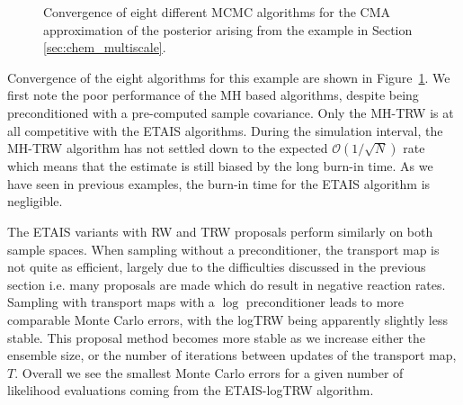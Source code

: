 \documentclass[final]{siamltex}
\begin{document}
\begin{figure}[!htb]
\centering
{}
\caption{Convergence of eight different MCMC algorithms for the CMA
  approximation of the  posterior arising from the example in Section \ref{sec:chem_multiscale}.}
\label{fig:chem_multiscale_L2}
\end{figure}

Convergence of the eight algorithms for this example are shown in
Figure~\ref{fig:chem_multiscale_L2}. We first note the poor
performance of the MH based algorithms, despite being preconditioned
with a pre-computed sample covariance. Only the MH-TRW is at all competitive with the ETAIS algorithms. During the simulation interval, the MH-TRW algorithm has not settled down to the expected $\mathcal{O}(1/\sqrt{N})$ rate which means that the estimate is still biased by the long burn-in time. As we have seen in previous examples, the burn-in time for the ETAIS algorithm is negligible.

The ETAIS variants with RW and TRW proposals perform similarly on both
sample spaces. When sampling without a preconditioner, the transport map is not
quite as efficient, largely due to the difficulties discussed in the
previous section i.e. many proposals are made which do result in
negative reaction rates. Sampling with transport maps with a $\log$
preconditioner leads to more comparable Monte Carlo errors, with the
logTRW being apparently slightly less stable. This proposal method
becomes more stable as we increase either the ensemble size, or the
number of iterations between updates of the transport map,
$T$. Overall we see the smallest Monte Carlo errors for a given number
of likelihood evaluations coming from the ETAIS-logTRW algorithm.
\end{document}
